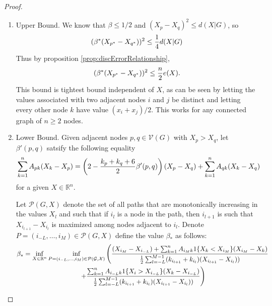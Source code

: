 \documentclass{article}
\theoremstyle{remark}
\newcommand{\R}[0]{\mathbb{R}}
\begin{document}
\begin{proof}
        \begin{enumerate}
                \item Upper Bound. We know that $\beta\leq1/2$ and $(X_p-X_q)^2 \leq d(X|G)$, so
                        \begin{equation}{\label{eq:updateSizeBound1}}
                                (\beta^*(X_{p^*}-X_{q^*}))^2\leq \frac{1}{4}d(X|G)
                        \end{equation}
                        Thus by proposition \ref{prop:discErrorRelationship},
                        \begin{equation}{\label{eq:updateSizeBound2}}
                                (\beta^*(X_{p^*}-X_{q^*}))^2 \leq \frac{n}{2}e(X).
                        \end{equation}
                        This bound is tightest bound independent of $X$, as can be seen by letting the values associated with two adjacent nodes $i$ and $j$ be distinct and letting every other node $k$ have value $(x_i+x_j)/2$. This works for any connected graph of $n\geq2$ nodes.
		\item Lower Bound. Given adjacent nodes $p,q\in\mathcal{V}(G)$ with $X_p>X_q$, let $\beta'(p,q)$ satsify the following equality
			\begin{equation}{\label{prop:errorUpdateEquivImproved:eq:1}}
				\sum_{k=1}^nA_{pk}(X_k-X_p) = \left(2 - \frac{k_p+k_q+6}{2}\beta'(p,q)\right)(X_p-X_q) + \sum_{k=1}^nA_{qk}(X_k-X_q) 
			\end{equation}
			for a given $X\in\R^n$.

			Let $\mathcal{P}(G,X)$ denote the set of all paths that are monotonically increasing in the values $X_{l}$ and such that if $i_l$ is a node in the path, then $i_{l+1}$ is such that $X_{i_{l+1}}-X_{i_{l}}$ is maximized among nodes adjacent to $i_l$. Denote $P=(i_{-L},\ldots,i_M) \in \mathcal{P}(G,X)$ define the value $\beta_*$ as follows:
			\begin{multline}{\label{eq:betaStarDefn}}
				\beta_* = \inf_{X\in\R^n}\inf_{P=(i_{-L},\ldots,i_M)\in\mathcal{P(G,X)}}\left(\frac{(X_{i_M}-X_{i_{-L}}) + \sum_{k=1}^nA_{i_{M}k}1\{X_{k}<X_{i_M}\}(X_{i_{M}}-X_{k})}{\frac{1}{2}\sum_{l=-L}^{M-1}(k_{i_{l+1}}+k_{i_{l}})(X_{i_{l+1}}-X_{i_l}))}\right.\\ \left.+ \frac{\sum_{k=1}^nA_{i_{-L}k}1\{X_{i}>X_{i_{-L}}\}(X_{k}-X_{i_{-L}})}{\frac{1}{2}\sum_{l=-L}^{M-1}(k_{i_{l+1}}+k_{i_{l}})(X_{i_{l+1}}-X_{i_l}))}\right)
			\end{multline}
			

\end{enumerate}
\end{proof}
\end{document}
